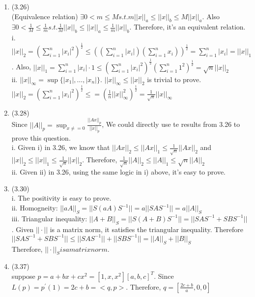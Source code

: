 \documentclass[letterpaper,12pt]{article}
\theoremstyle{definition}
\begin{document}
\begin{enumerate}
	\item(3.26)\\
	(Equivalence relation) $\exists 0 < m \leq M         s.t. m||x||_{a} \leq ||x||_{b} \leq M||x||_{a}$. Also $\exists 0 < \frac{1}{M} \leq \frac{1}{m}        s.t. \frac{1}{M}||x||_{b} \leq ||x||_{a} \leq \frac{1}{m}||x||_{b}$. Therefore, it's an equivalent relation.\\
	i. $||x||_{2} = (\sum_{i = 1}^{n}|x_{i}|^{2})^{\frac{1}{2}} \leq ((\sum_{i =1}^{n}|x_{i}|)(\sum_{i = 1}^{n}x_{i}))^{\frac{1}{2}} = \sum_{i = 1}^{n}|x_{i}| = ||x||_{1}$. Also, $||x||_{1} = \sum_{i = 1}^{n}|x_{i}|\cdot 1 \leq (\sum_{i  = 1}^{n}|x_{i}|^{2})^{\frac{1}{2}}(\sum_{i = 1}^{n}1^{2})^{\frac{1}{2}}  = \sqrt{n}||x||_{2}$\\
	ii. $||x||_{\infty} = \sup \{|x_{1}|, \hdots, |x_{n}|\}$. $||x||_{\infty} \leq ||x||_{2}$ is trivial to prove. $||x||_{2} = (\sum_{i = 1}^{n}|x_{i}|^{2})^{\frac{1}{2}} \leq = (\frac{1}{n}||x||_{\infty}^{2})^{\frac{1}{2}} = \frac{1}{\sqrt{n}}||x||_{\infty}$\\

	\item(3.28)\\
	Since $||A||_{p} = \sup_{x \neq =0}\frac{||Ax||_{p}}{||x||_{p}}$, We could directly use te results from 3.26 to prove this question. \\
	i. Given i) in 3.26, we know that $||Ax||_{2} \leq ||Ax||_{1} \leq \frac{1}{\sqrt{n}}||Ax||_{2}$ and $||x||_{2} \leq ||x||_{1} \leq \frac{1}{\sqrt{n}}||x||_{2}$. Therefore, $\frac{1}{\sqrt{n}}||A||_{2} \leq ||A||_{1} \leq \sqrt{n}||A||_{2}$\\
	ii. Given ii) in 3.26, using the same logic in i) above, it's  easy to prove.\\

	\item(3.30)\\
	i. The positivity is easy to prove. \\
	ii. Homogneity: $||aA||_{S} = ||S(aA)S^{-1}|| = a||SAS^{-1}|| = a||A||_{S}$\\
	iii. Triangular inequality: $||A+ B||_{S} = ||S(A+B)S^{-1}|| = ||SAS^{-1} + SBS^{-1}||$. Given $||\cdot||$ is a matrix norm, it satisfies the triangular inequality. Therefore $||SAS^{-1} + SBS^{-1}|| \leq ||SAS^{-1}|| + ||SBS^{-1}|| = ||A||_{S} +||B||_{S}$\\
	Therefore, $||\cdot||_{S} is a matrix norm.$\\

	\item(3.37)\\
	suppose $p =  a + bx +cx^{2} = [1,  x,  x^2][a,  b,  c]^{T}$. Since$L(p) =  p^{'}(1) = 2c + b = <q, p>$. Therefore, $q = [\frac{2c + b}{a}, 0, 0]$\\


\end{enumerate}
\end{document}
